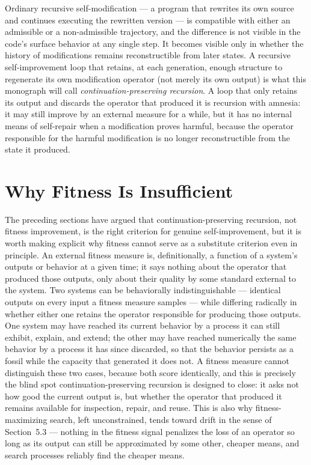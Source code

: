\documentclass[11pt]{book}
\begin{document}
Ordinary recursive self-modification --- a program that rewrites its own source and continues executing the rewritten version --- is compatible with either an admissible or a non-admissible trajectory, and the difference is not visible in the code's surface behavior at any single step. It becomes visible only in whether the history of modifications remains reconstructible from later states. A recursive self-improvement loop that retains, at each generation, enough structure to regenerate its own modification operator (not merely its own output) is what this monograph will call \emph{continuation-preserving recursion}. A loop that only retains its output and discards the operator that produced it is recursion with amnesia: it may still improve by an external measure for a while, but it has no internal means of self-repair when a modification proves harmful, because the operator responsible for the harmful modification is no longer reconstructible from the state it produced.

\section{Why Fitness Is Insufficient}

The preceding sections have argued that continuation-preserving recursion, not fitness improvement, is the right criterion for genuine self-improvement, but it is worth making explicit why fitness cannot serve as a substitute criterion even in principle. An external fitness measure is, definitionally, a function of a system's outputs or behavior at a given time; it says nothing about the operator that produced those outputs, only about their quality by some standard external to the system. Two systems can be behaviorally indistinguishable --- identical outputs on every input a fitness measure samples --- while differing radically in whether either one retains the operator responsible for producing those outputs. One system may have reached its current behavior by a process it can still exhibit, explain, and extend; the other may have reached numerically the same behavior by a process it has since discarded, so that the behavior persists as a fossil while the capacity that generated it does not. A fitness measure cannot distinguish these two cases, because both score identically, and this is precisely the blind spot continuation-preserving recursion is designed to close: it asks not how good the current output is, but whether the operator that produced it remains available for inspection, repair, and reuse. This is also why fitness-maximizing search, left unconstrained, tends toward drift in the sense of Section~5.3 --- nothing in the fitness signal penalizes the loss of an operator so long as its output can still be approximated by some other, cheaper means, and search processes reliably find the cheaper means.
\end{document}
